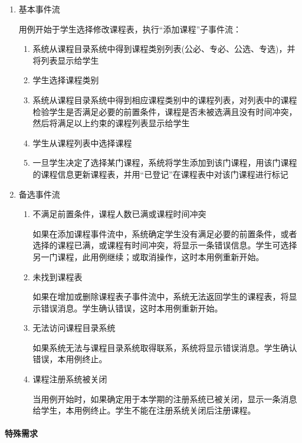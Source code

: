   \begin{enumerate}
    \item 基本事件流
    
    用例开始于学生选择修改课程表，执行“添加课程”子事件流：
    \begin{enumerate}[(1)]
      \item 系统从课程目录系统中得到课程类别列表(公必、专必、公选、专选)，并将列表显示给学生
      \item 学生选择课程类别
      \item 系统从课程目录系统中得到相应课程类别中的课程列表，对列表中的课程检验学生是否满足必要的前置条件，课程是否未被选满且没有时间冲突，然后将满足以上约束的课程列表显示给学生
      \item 学生从课程列表中选择课程
      \item 一旦学生决定了选择某门课程，系统将学生添加到该门课程，用该门课程的课程信息更新课程表，并用“已登记”在课程表中对该门课程进行标记
    \end{enumerate}

    \item 备选事件流
    \begin{enumerate}[(1)]
      \item 不满足前置条件，课程人数已满或课程时间冲突
      
      \CJKindent 如果在添加课程事件流中，系统确定学生没有满足必要的前置条件，或者选择的课程已满，或课程有时间冲突，将显示一条错误信息。学生可选择另一门课程，此用例继续；或取消操作，这时本用例重新开始。
      
      \item 未找到课程表
      
      \CJKindent 如果在增加或删除课程表子事件流中，系统无法返回学生的课程表，将显示错误消息。学生确认错误，这时本用例重新开始。
      
      \item 无法访问课程目录系统
      
      \CJKindent 如果系统无法与课程目录系统取得联系，系统将显示错误消息。学生确认错误，本用例终止。
      
      \item 课程注册系统被关闭
      
      \CJKindent 当用例开始时，如果确定用于本学期的注册系统已被关闭，显示一条消息给学生，本用例终止。学生不能在注册系统关闭后注册课程。
    \end{enumerate}
  \end{enumerate}
  
\paragraph{特殊需求}
  
